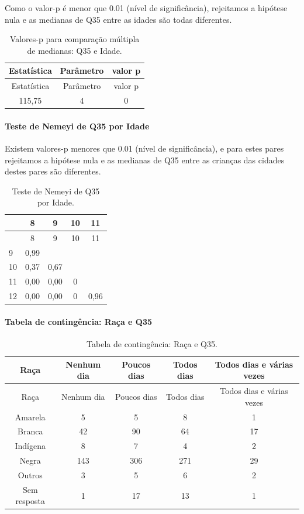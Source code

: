 \documentclass[]{article}
\let\oldparagraph\paragraph
\renewcommand{\paragraph}[1]{\oldparagraph{#1}\mbox{}}
\begin{document}
Como o valor-p é menor que 0.01 (nível de significância), rejeitamos a hipótese nula e as medianas de Q35 entre as idades são todas diferentes.

\begin{longtable}[]{@{}ccc@{}}
\caption{\label{tab:unnamed-chunk-1278}Valores-p para comparação múltipla de medianas: Q35 e Idade.}\tabularnewline
\toprule
Estatística & Parâmetro & valor p\tabularnewline
\midrule
\endfirsthead
\toprule
Estatística & Parâmetro & valor p\tabularnewline
\midrule
\endhead
115,75 & 4 & 0\tabularnewline
\bottomrule
\end{longtable}

\hypertarget{teste-de-nemeyi-de-q35-por-idade}{%
\paragraph{Teste de Nemeyi de Q35 por Idade}\label{teste-de-nemeyi-de-q35-por-idade}}

Existem valores-p menores que 0.01 (nível de significância), e para estes pares rejeitamos a hipótese nula e as medianas de Q35 entre as crianças das cidades destes pares são diferentes.

\begin{longtable}[]{@{}lcccc@{}}
\caption{\label{tab:unnamed-chunk-1280}Teste de Nemeyi de Q35 por Idade.}\tabularnewline
\toprule
& 8 & 9 & 10 & 11\tabularnewline
\midrule
\endfirsthead
\toprule
& 8 & 9 & 10 & 11\tabularnewline
\midrule
\endhead
9 & 0,99 & & &\tabularnewline
10 & 0,37 & 0,67 & &\tabularnewline
11 & 0,00 & 0,00 & 0 &\tabularnewline
12 & 0,00 & 0,00 & 0 & 0,96\tabularnewline
\bottomrule
\end{longtable}

\cleardoublepage

\hypertarget{tabela-de-continguxeancia-rauxe7a-e-q35}{%
\paragraph{Tabela de contingência: Raça e Q35}\label{tabela-de-continguxeancia-rauxe7a-e-q35}}

\begin{longtable}[]{@{}ccccc@{}}
\caption{\label{tab:unnamed-chunk-1281}Tabela de contingência: Raça e Q35.}\tabularnewline
\toprule
Raça & Nenhum dia & Poucos dias & Todos dias & Todos dias e várias vezes\tabularnewline
\midrule
\endfirsthead
\toprule
Raça & Nenhum dia & Poucos dias & Todos dias & Todos dias e várias vezes\tabularnewline
\midrule
\endhead
Amarela & 5 & 5 & 8 & 1\tabularnewline
Branca & 42 & 90 & 64 & 17\tabularnewline
Indígena & 8 & 7 & 4 & 2\tabularnewline
Negra & 143 & 306 & 271 & 29\tabularnewline
Outros & 3 & 5 & 6 & 2\tabularnewline
Sem resposta & 1 & 17 & 13 & 1\tabularnewline
\bottomrule
\end{longtable}
\end{document}

